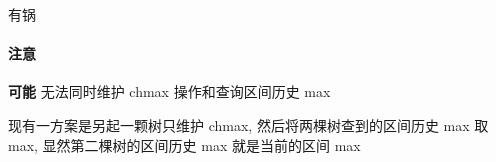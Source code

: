 有锅

\paragraph{注意} \textbf{可能} 无法同时维护 chmax 操作和查询区间历史 max

现有一方案是另起一颗树只维护 chmax, 然后将两棵树查到的区间历史 max 取 max, 显然第二棵树的区间历史 max 就是当前的区间 max
